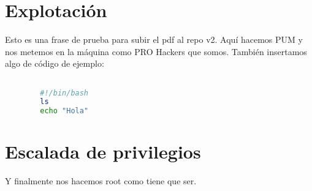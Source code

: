 \documentclass[a4paper]{article} %
\begin{document}
	\section{Explotación}
	Esto es una frase de prueba para subir el pdf al repo v2.
	Aquí hacemos PUM y nos metemos en la máquina como PRO Hackers que somos. También insertamos algo de código de ejemplo: 
	
	\begin{lstlisting}[language=Bash, caption=Código de ejemplo]

		#!/bin/bash
		ls
		echo "Hola"
	\end{lstlisting}
	
	
	
	\section{Escalada de privilegios}
	Y finalmente nos hacemos root como tiene que ser. 
	
	
\end{document}
